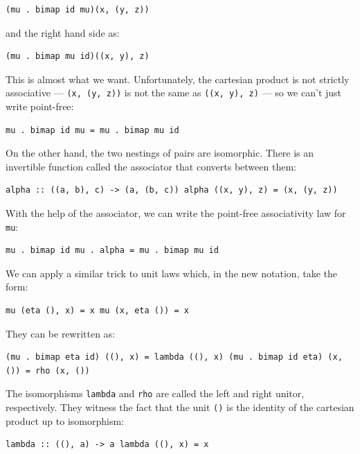 \begin{verbatim}
(mu . bimap id mu)(x, (y, z))
\end{verbatim}

and the right hand side as:

\begin{verbatim}
(mu . bimap mu id)((x, y), z)
\end{verbatim}

This is almost what we want. Unfortunately, the cartesian product is not
strictly associative --- \texttt{(x,\ (y,\ z))} is not the same as
\texttt{((x,\ y),\ z)} --- so we can't just write point-free:

\begin{verbatim}
mu . bimap id mu = mu . bimap mu id
\end{verbatim}

On the other hand, the two nestings of pairs are isomorphic. There is an
invertible function called the associator that converts between them:

\begin{verbatim}
alpha :: ((a, b), c) -> (a, (b, c)) alpha ((x, y), z) = (x, (y, z))
\end{verbatim}

With the help of the associator, we can write the point-free
associativity law for \texttt{mu}:

\begin{verbatim}
mu . bimap id mu . alpha = mu . bimap mu id
\end{verbatim}

We can apply a similar trick to unit laws which, in the new notation,
take the form:

\begin{verbatim}
mu (eta (), x) = x mu (x, eta ()) = x
\end{verbatim}

They can be rewritten as:

\begin{verbatim}
(mu . bimap eta id) ((), x) = lambda ((), x) (mu . bimap id eta) (x, ()) = rho (x, ())
\end{verbatim}

The isomorphisms \texttt{lambda} and \texttt{rho} are called the left
and right unitor, respectively. They witness the fact that the unit
\texttt{()} is the identity of the cartesian product up to isomorphism:

\begin{verbatim}
lambda :: ((), a) -> a lambda ((), x) = x
\end{verbatim}

